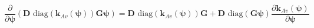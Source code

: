 \begin{equation}
\label{eq:richards-newton-deriv-detail}
\frac{\partial}{\partial\boldsymbol{\psi}}
\left(
\mathbf{D}
    \text{ diag}\left(\mathbf{k}_{Av}(\boldsymbol{\psi})\right)
\mathbf{G} \boldsymbol{\psi}
\right)
=
\mathbf{D}
    \text{ diag}\left(\mathbf{k}_{Av}(\boldsymbol{\psi})\right)
\mathbf{G}
+
\mathbf{D}
    \text{ diag}\left(\mathbf{G}\boldsymbol{\psi}\right)
\frac{\partial\mathbf{k}_{Av}(\boldsymbol{\psi})}{\partial\boldsymbol{\psi}}
\end{equation}

